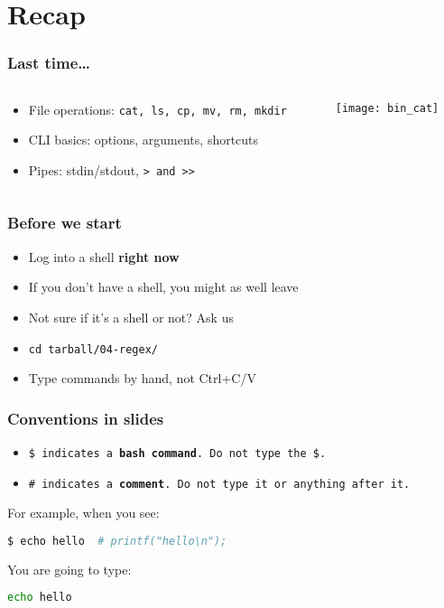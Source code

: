 \section{Recap}
\begin{frame}
\frametitle{Last time…}
\begin{columns}
    \begin{column}{0.6\textwidth}
        \begin{itemize}
            \item File operations: \tt{cat, ls, cp, mv, rm, mkdir}
            \item CLI basics: options, arguments, shortcuts
            \item Pipes: stdin/stdout, \tt{>} and \tt{>>}
        \end{itemize}
    \end{column}
    \begin{column}{0.4\textwidth}
        \texttt{[image: bin\_cat]}
    \end{column}
\end{columns}
\end{frame}

\begin{frame}
\frametitle{Before we start}
\begin{itemize}
    \item Log into a shell \textbf{right now}
    \item If you don't have a shell, you might as well leave
    \item Not sure if it's a shell or not? Ask us
    \item \tt{cd tarball/04-regex/}
    \item Type commands by hand, not Ctrl+C/V
\end{itemize}
\end{frame}

\begin{frame}[fragile]
\frametitle{Conventions in slides}
\begin{itemize}
    \item \tt{\$} indicates a \textbf{bash command}.
        Do not type the \tt{\$}.
    \item \tt{\#} indicates a \textbf{comment}.
        Do not type it or anything after it.
\end{itemize}
For example, when you see:
\begin{lstlisting}[language=bash]
$ echo hello  # printf("hello\n");
\end{lstlisting}
You are going to type:
\begin{lstlisting}[language=bash]
echo hello
\end{lstlisting}
\end{frame}

